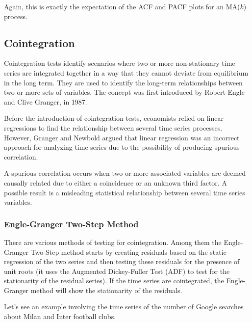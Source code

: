 \documentclass[11pt]{article}
\begin{document}
Again, this is exactly the expectation of the ACF and PACF plots for an
MA(\(k\)) process.

    \hypertarget{cointegration}{%
\subsection{Cointegration}\label{cointegration}}

Cointegration tests identify scenarios where two or more non-stationary
time series are integrated together in a way that they cannot deviate
from equilibrium in the long term. They are used to identify the
long-term relationships between two or more sets of variables. The
concept was first introduced by Robert Engle and Clive Granger, in 1987.

Before the introduction of cointegration tests, economists relied on
linear regressions to find the relationship between several time series
processes. However, Granger and Newbold argued that linear regression
was an incorrect approach for analyzing time series due to the
possibility of producing spurious correlation.

A spurious correlation occurs when two or more associated variables are
deemed causally related due to either a coincidence or an unknown third
factor. A possible result is a misleading statistical relationship
between several time series variables.

\hypertarget{engle-granger-two-step-method}{%
\subsubsection{Engle-Granger Two-Step
Method}\label{engle-granger-two-step-method}}

There are various methods of testing for cointegration. Among them the
Engle-Granger Two-Step method starts by creating residuals based on the
static regression of the two series and then testing these residuals for
the presence of unit roots (it uses the Augmented Dickey-Fuller Test
(ADF) to test for the stationarity of the residual series). If the time
series are cointegrated, the Engle-Granger method will show the
stationarity of the residuals.

Let's see an example involving the time series of the number of Google
searches about Milan and Inter football clubs.
\end{document}
